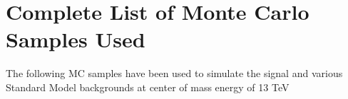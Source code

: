 \chapter{Complete List of Monte Carlo Samples Used}
\label{sec:samples_appendix}
The following MC samples have been used to simulate the signal and various Standard Model backgrounds at center of mass energy of 13 TeV